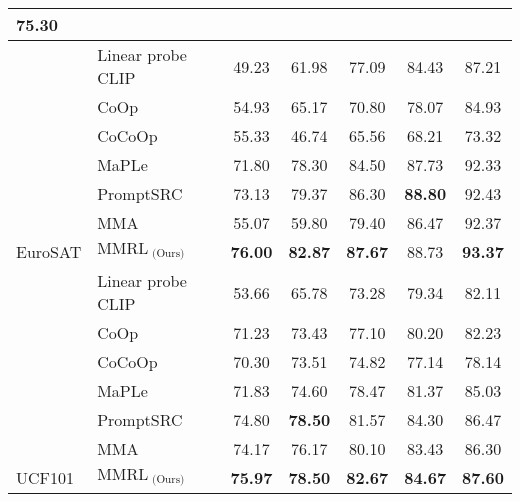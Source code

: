 \begin{table*}[t]
{{\begin{tabular}{@{}ll|ccccc}
      \cellcolor[HTML]{E8E8E8}\textbf{75.30} \\ \midrule
     &
      Linear probe CLIP &
      49.23 &
      61.98 &
      77.09 &
      84.43 &
      87.21 \\
     &
      CoOp &
      54.93 &
      65.17 &
      70.80 &
      78.07 &
      84.93 \\
     &
      CoCoOp &
      55.33 &
      46.74 &
      65.56 &
      68.21 &
      73.32 \\
     &
      MaPLe &
      71.80 &
      78.30 &
      84.50 &
      87.73 &
      92.33 \\
     &
      PromptSRC &
      73.13 &
      79.37 &
      86.30 &
      \textbf{88.80} &
      92.43 \\
     &
      MMA &
      55.07 &
      59.80 &
      79.40 &
      86.47 &
      92.37 \\
    \multirow{-7}{*}{EuroSAT} &
      \cellcolor[HTML]{E8E8E8}$\text{MMRL}_{\text{ (Ours)}}$ &
      \cellcolor[HTML]{E8E8E8}\textbf{76.00} &
      \cellcolor[HTML]{E8E8E8}\textbf{82.87} &
      \cellcolor[HTML]{E8E8E8}\textbf{87.67} &
      \cellcolor[HTML]{E8E8E8}88.73 &
      \cellcolor[HTML]{E8E8E8}\textbf{93.37} \\ \midrule
     &
      Linear probe CLIP &
      53.66 &
      65.78 &
      73.28 &
      79.34 &
      82.11 \\
     &
      CoOp &
      71.23 &
      73.43 &
      77.10 &
      80.20 &
      82.23 \\
     &
      CoCoOp &
      70.30 &
      73.51 &
      74.82 &
      77.14 &
      78.14 \\
     &
      MaPLe &
      71.83 &
      74.60 &
      78.47 &
      81.37 &
      85.03 \\
     &
      PromptSRC &
      74.80 &
      \textbf{78.50} &
      81.57 &
      84.30 &
      86.47 \\
     &
      MMA &
      74.17 &
      76.17 &
      80.10 &
      83.43 &
      86.30 \\
    \multirow{-7}{*}{UCF101} &
      \cellcolor[HTML]{E8E8E8}$\text{MMRL}_{\text{ (Ours)}}$ &
      \cellcolor[HTML]{E8E8E8}\textbf{75.97} &
      \cellcolor[HTML]{E8E8E8}\textbf{78.50} &
      \cellcolor[HTML]{E8E8E8}\textbf{82.67} &
      \cellcolor[HTML]{E8E8E8}\textbf{84.67} &
      \cellcolor[HTML]{E8E8E8}\textbf{87.60} \\ \bottomrule
    \end{tabular}
    }
    }
\end{table*}


